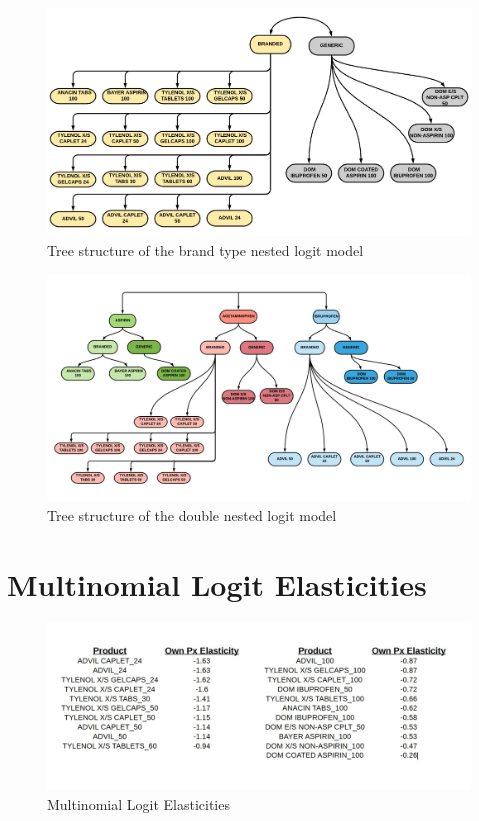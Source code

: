 \documentclass[12pt, authoryear]{elsarticle}
\begin{document}
\begin{figure}[H]
	\centering
	\includegraphics[clip, angle=0, width=1\textwidth]{FIG3.pdf}
	\caption{Tree structure of the brand type nested logit model}\label{app_brand_tree}
\end{figure}

\begin{figure}[H]
	\centering
	\includegraphics[clip, angle=0, width=1\textwidth]{FIG2.pdf}
	\caption{Tree structure of the double nested logit model}\label{app_double_tree}
\end{figure}




\section{Multinomial Logit Elasticities}  \label{app1}

\begin{figure}[H]
	\centering
	\includegraphics[clip, angle=0, width=1\textwidth]{own_p_elas}
	\caption{Multinomial Logit Elasticities }\label{elas0}
\end{figure}
\end{document}
